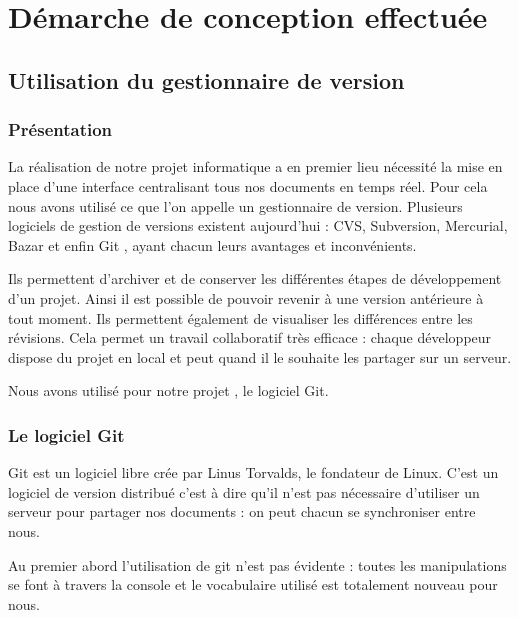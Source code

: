 \chapter{D\'emarche de conception effectu\'ee}
\label{chap:outils utilises}

\section{Utilisation du gestionnaire de version }
\subsection{Pr\'esentation}
La r\'ealisation de notre projet informatique a en premier lieu n\'ecessit\'e la mise en place d'une interface centralisant tous nos
documents en temps r\'eel. Pour cela nous avons utilis\'e ce que l'on appelle un gestionnaire de version. Plusieurs logiciels de gestion 
de versions existent aujourd'hui : CVS, Subversion, Mercurial, Bazar et enfin Git \cite{git}, ayant chacun leurs avantages et inconv\'enients. 

Ils permettent d'archiver et de conserver les diff\'erentes \'etapes de d\'eveloppement d'un projet. Ainsi il est possible de pouvoir revenir
\`a une version ant\'erieure \`a tout moment. Ils permettent \'egalement de visualiser les diff\'erences entre les r\'evisions. Cela permet un  
travail collaboratif tr\`es efficace : chaque d\'eveloppeur dispose du projet en local et peut quand il le souhaite les partager sur un serveur.

Nous avons utilis\'e pour notre projet \citep{projet11efr}, le logiciel Git.

\subsection{Le logiciel Git}
Git est un logiciel libre cr\'ee par Linus Torvalds, le fondateur de Linux. C'est un logiciel de version distribu\'e c'est \`a dire qu'il n'est
 pas n\'ecessaire d'utiliser un serveur pour partager nos documents : on peut chacun se synchroniser entre nous.

Au premier abord l'utilisation de git n'est pas \'evidente : toutes les manipulations se font \`a travers la console et le vocabulaire utilis\'e 
est totalement nouveau pour nous. 

